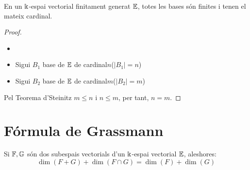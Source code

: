 \begin{col}
En un $\Bbbk$-espai vectorial finitament generat $\mathbb{E}$, totes les bases són finites i tenen el mateix cardinal.
\end{col}

\begin{proof}
\begin{itemize}
    \item[]
    \item Sigui $B_1$ base de $\mathbb{E}$  de cardinal$n$($|B_1| = n$)
    \item Sigui $B_2$ base de $\mathbb{E}$ de cardinal$m$($|B_2| = m$)
\end{itemize}
\noindent
Pel Teorema d'Steinitz $m \leq n$ i $n \leq m$, per tant, $n=m$.
\end{proof}


\section{Fórmula de Grassmann}
Si $\mathbb{F} , \mathbb{G}$ són dos subespais vectorials d'un $\Bbbk$-espai vectorial $\mathbb{E}$, aleshores:
$$ \dim(F + G) + \dim(F \cap G) = \dim(F) + \dim(G) $$

